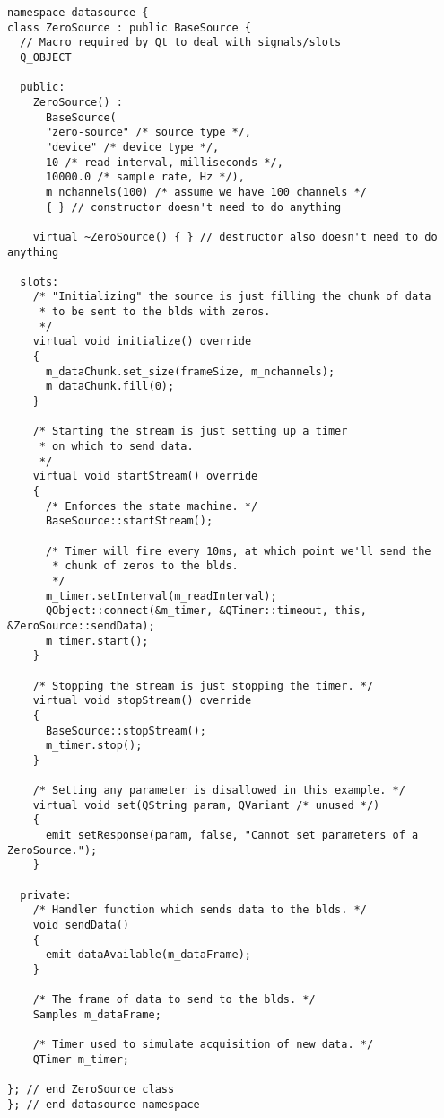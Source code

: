 \documentclass[12pt]{article}
\begin{document}
\begin{verbatim}
namespace datasource {
class ZeroSource : public BaseSource {
  // Macro required by Qt to deal with signals/slots
  Q_OBJECT

  public:
    ZeroSource() : 
      BaseSource(
      "zero-source" /* source type */,
      "device" /* device type */,
      10 /* read interval, milliseconds */,
      10000.0 /* sample rate, Hz */),
      m_nchannels(100) /* assume we have 100 channels */
      { } // constructor doesn't need to do anything
  
    virtual ~ZeroSource() { } // destructor also doesn't need to do anything
  
  slots:
    /* "Initializing" the source is just filling the chunk of data
     * to be sent to the blds with zeros.
     */
    virtual void initialize() override
    {
      m_dataChunk.set_size(frameSize, m_nchannels);
      m_dataChunk.fill(0);
    }
    
    /* Starting the stream is just setting up a timer
     * on which to send data.
     */
    virtual void startStream() override
    {
      /* Enforces the state machine. */
      BaseSource::startStream();
    
      /* Timer will fire every 10ms, at which point we'll send the
       * chunk of zeros to the blds.
       */
      m_timer.setInterval(m_readInterval);
      QObject::connect(&m_timer, &QTimer::timeout, this, &ZeroSource::sendData);
      m_timer.start();
    }
    
    /* Stopping the stream is just stopping the timer. */
    virtual void stopStream() override
    {
      BaseSource::stopStream();
      m_timer.stop();
    }
    
    /* Setting any parameter is disallowed in this example. */
    virtual void set(QString param, QVariant /* unused */)
    {
      emit setResponse(param, false, "Cannot set parameters of a ZeroSource.");
    }

  private:
    /* Handler function which sends data to the blds. */
    void sendData()
    {
      emit dataAvailable(m_dataFrame);
    }
    
    /* The frame of data to send to the blds. */
    Samples m_dataFrame;
    
    /* Timer used to simulate acquisition of new data. */
    QTimer m_timer;
    	  
}; // end ZeroSource class
}; // end datasource namespace
\end{verbatim}
\end{document}
